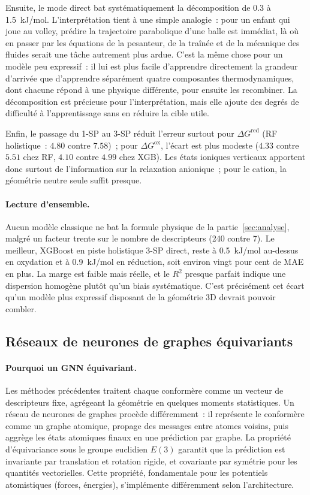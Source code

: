 Ensuite, le mode direct bat systématiquement la décomposition de \SI{0.3}{} à \SI{1.5}{kJ/mol}. L'interprétation tient à une simple analogie~: pour un enfant qui joue au volley, prédire la trajectoire parabolique d'une balle est immédiat, là où en passer par les équations de la pesanteur, de la traînée et de la mécanique des fluides serait une tâche autrement plus ardue. C'est la même chose pour un modèle peu expressif~: il lui est plus facile d'apprendre directement la grandeur d'arrivée que d'apprendre séparément quatre composantes thermodynamiques, dont chacune répond à une physique différente, pour ensuite les recombiner. La décomposition est précieuse pour l'interprétation, mais elle ajoute des degrés de difficulté à l'apprentissage sans en réduire la cible utile.

Enfin, le passage du 1-SP au 3-SP réduit l'erreur surtout pour $\Delta G^\text{red}$ (RF holistique~: $4.80$ contre $7.58$)~; pour $\Delta G^\text{ox}$, l'écart est plus modeste ($4.33$ contre $5.51$ chez RF, $4.10$ contre $4.99$ chez XGB). Les états ioniques verticaux apportent donc surtout de l'information sur la relaxation anionique~; pour le cation, la géométrie neutre seule suffit presque.

\paragraph{Lecture d'ensemble.}
Aucun modèle classique ne bat la formule physique de la partie~\ref{sec:analyse}, malgré un facteur trente sur le nombre de descripteurs (240 contre 7). Le meilleur, XGBoost en piste holistique 3-SP direct, reste à \SI{0.5}{kJ/mol} au-dessus en oxydation et à \SI{0.9}{kJ/mol} en réduction, soit environ vingt pour cent de MAE en plus. La marge est faible mais réelle, et le $R^2$ presque parfait indique une dispersion homogène plutôt qu'un biais systématique. C'est précisément cet écart qu'un modèle plus expressif disposant de la géométrie 3D devrait pouvoir combler.

\subsection{Réseaux de neurones de graphes équivariants}
\label{sec:ml_gnn}

\paragraph{Pourquoi un GNN équivariant.}
Les méthodes précédentes traitent chaque conformère comme un vecteur de descripteurs fixe, agrégeant la géométrie en quelques moments statistiques. Un réseau de neurones de graphes procède différemment~: il représente le conformère comme un graphe atomique, propage des messages entre atomes voisins, puis aggrège les états atomiques finaux en une prédiction par graphe. La propriété d'équivariance sous le groupe euclidien $E(3)$ garantit que la prédiction est invariante par translation et rotation rigide, et covariante par symétrie pour les quantités vectorielles. Cette propriété, fondamentale pour les potentiels atomistiques (forces, énergies), s'implémente différemment selon l'architecture.

